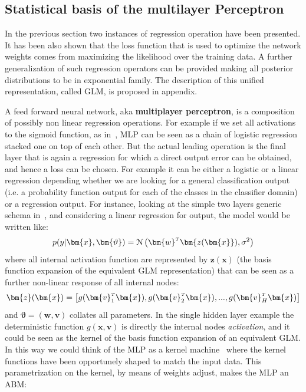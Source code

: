 \subsection{Statistical basis of the multilayer Perceptron}
\label{section:feedforward dense networks}

In the previous section two instances of regression operation have been presented. It has been also shown that the loss function that is used to optimize the network weights comes from maximizing the likelihood over the training data.
A further generalization of such regression operators can be provided making all posterior distributions to be in exponential family. The description of this unified representation, called \ac{GLM}, is proposed in appendix.

A feed forward neural network, aka \textbf{multiplayer perceptron}, is a composition of possibly non linear regression operations. For example if we set all activations to the sigmoid function, as in~\Figure{\ref{fig:mlp_b}}, \acs{MLP} can be seen as a chain of logistic regression stacked one on top of each other. But the actual leading operation is the final layer that is again a regression for which a direct output error can be obtained, and hence a loss can be chosen. For example it can be either a logistic or a linear regression depending whether we are looking for a general classification output (i.e. a probability function output for each of the classes in the classifier domain) or a regression output. 
For instance, looking at the simple two layers generic schema in~\Figure{\ref{fig:generic_mlp_a}}, and considering a linear regression for output, the model would be written like:
\begin{equation}
    p(y|\bm{x},\bm{\vartheta}) = \mathcal{N}\left(\transpose{\bm{w}}\bm{z(\bm{x}}), \sigma^2 \right)
    \label{eq:mlp_a}
\end{equation}
where all internal activation function are represented by $\bm{z}(\bm{x})$ (the basis function expansion of the equivalent \acs{GLM} representation) that can be seen as a further non-linear response of all internal nodes:
\begin{equation}
    \bm{z}(\bm{x}) = \left[ g(\transpose{\bm{v}_1}\bm{x}), g(\transpose{\bm{v}_2}\bm{x}), ..., g(\transpose{\bm{v}_H}\bm{x})
    \right]
    \label{eq:mlp_b}
\end{equation}
and $\bm{\vartheta} = (\bm{w},\bm{v})$ collates all parameters.
In the single hidden layer example the deterministic function $g(\bm{x},\bm{v})$ is directly the internal nodes \textit{activation}, and it could be seen as the kernel of the basis function expansion of an equivalent \acs{GLM}. In this way we could think of the \acl{MLP} as a kernel machine~\cite{Scholkopf:1999:AKM:299094} where the kernel functions have been opportunely shaped to match the input data. This parametrization on the kernel, by means of weights adjust,  makes the \acl{MLP} an \ac{ABM}:
